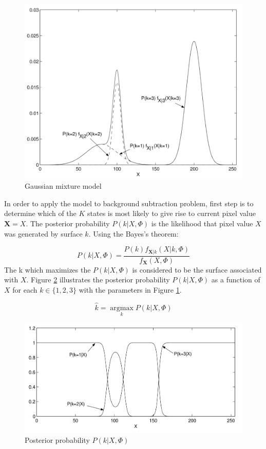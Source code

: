 \begin{figure}
    \centering
    \includegraphics[width=\linewidth]{images/gaussian-mixture-model.png}
    \caption[Gaussian mixture model]{Gaussian mixture model\cite{power2002understanding}}
    \label{fig:gaussian-mixture-model}
\end{figure}

In order to apply the model to background subtraction problem, first step is to determine which of the $K$ states is most likely to give rise to current pixel value $\mathbf{X}=X$. The posterior probability $P(k|X,\Phi)$ is the likelihood that pixel value $X$ was generated by surface $k$. Using the Bayes's theorem:

$$ P(k|X,\Phi) = \frac{P(k)f_{\mathbf{X}|k}(X|k,\Phi)}{f_\mathbf{X}(X,\Phi)} $$
The k which maximizes the $P(k|X,\Phi) $ is considered to be the surface associated with $X$. Figure \ref{fig:gaussian-posterior-probability} illustrates the posterior probability $P(k|X,\Phi) $ as a function of $X$ for each $k\in \{  1,2,3 \}$ with the parameters in Figure \ref{fig:gaussian-mixture-model}.

$$ \hat{k}=\operatorname*{argmax}_k P(k|X,\Phi)$$
\begin{figure}
    \centering
    \includegraphics[width=\linewidth]{images/gaussian-posterior-probability.PNG}
    \caption[Posterior probability]{Posterior probability  $P(k|X,\Phi) $\cite{power2002understanding}}
    \label{fig:gaussian-posterior-probability}
\end{figure}


